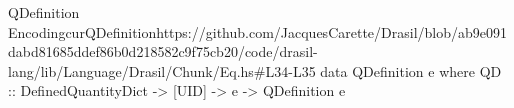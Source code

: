 \begin{haskell}{QDefinition Encoding}{curQDefinition}{https://github.com/JacquesCarette/Drasil/blob/ab9e091dabd81685ddef86b0d218582c9f75cb20/code/drasil-lang/lib/Language/Drasil/Chunk/Eq.hs\#L34-L35}
data QDefinition e where
  QD :: DefinedQuantityDict -> [UID] -> e -> QDefinition e
\end{haskell}
